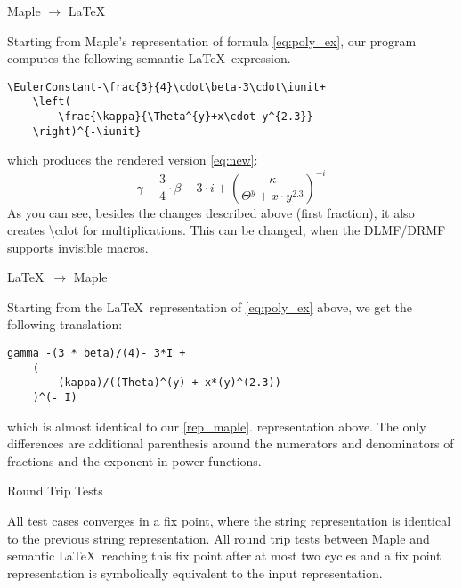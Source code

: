 \documentclass{article}
\newcommand{\iunit}{i}
\newcommand{\EulerConstant}{\gamma}
\begin{document}
\vspace{12pt}
\begin{center}
    \large Maple $\rightarrow$ \LaTeX\\
\end{center}
\noindent Starting from Maple's representation of formula \ref{eq:poly_ex}, our program computes the following semantic \LaTeX\ expression.
\begin{lstlisting}[mathescape,label=maple-latex,caption={Maple $\rightarrow$ \LaTeX}]
\EulerConstant-\frac{3}{4}\cdot\beta-3\cdot\iunit+
    \left(
        \frac{\kappa}{\Theta^{y}+x\cdot y^{2.3}}
    \right)^{-\iunit}
\end{lstlisting}
\noindent which produces the rendered version \ref{eq:new}:
\begin{equation}\label{eq:new}
\EulerConstant-\frac{3}{4}\cdot\beta-3\cdot\iunit+
    \left(
        \frac{\kappa}{\Theta^{y}+x\cdot y^{2.3}}
    \right)^{-\iunit}
\end{equation}
As you can see, besides the changes described above (first fraction), it also creates \textbackslash cdot for multiplications. This can be changed, when the DLMF/DRMF supports invisible macros.

\vspace{12pt}
\begin{center}
    \large \LaTeX\ $\rightarrow$ Maple\\
\end{center}
\noindent Starting from the \LaTeX\ representation of \ref{eq:poly_ex} above, we get the following translation:
\begin{lstlisting}[mathescape,label=latex-maple,caption={\LaTeX\ $\rightarrow$ Maple}]
gamma -(3 * beta)/(4)- 3*I +
    (
        (kappa)/((Theta)^(y) + x*(y)^(2.3))
    )^(- I)
\end{lstlisting}
which is almost identical to our \ref{rep_maple}. representation above. The only differences are additional parenthesis around the numerators and denominators of fractions and the exponent in power functions.

\vspace{12pt}
\begin{center}
    \large Round Trip Tests
\end{center}
All test cases converges in a fix point, where the string representation is identical to the previous string representation. All round trip tests between Maple and semantic \LaTeX\ reaching this fix point after at most two cycles and a fix point representation is symbolically equivalent to the input representation. 
\end{document}
